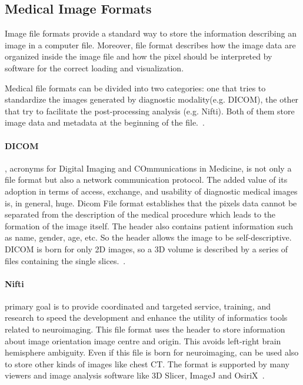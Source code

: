 \documentclass{standalone}
\begin{document}
	\subsection{Medical Image Formats}
	
 	Image file formats provide a standard way to store the information describing an image in a computer file. Moreover, file format describes how the image data are organized inside the image file and how the pixel should be interpreted by software for the correct loading and visualization.
 
	Medical file formats can be divided into two categories: one that tries to standardize the images generated by diagnostic modality(e.g. DICOM), the other that try to facilitate the post-processing analysis (e.g. Nifti). Both of them store image data and metadata at the beginning of the file.~\cite{ART:Larobina}. 
	
	\paragraph*{DICOM}, acronyms for Digital Imaging and COmmunications in Medicine, is not only a file format but also a network communication protocol. The added value of its adoption in terms of access, exchange, and usability of diagnostic medical images is, in general, huge. Dicom File format establishes that the pixels data cannot be separated from the description of the medical procedure which leads to the formation of the image itself. The header also contains patient information such as name, gender, age, etc. So the header allows the image to be self-descriptive. 
	DICOM is born for only 2D images, so a 3D volume is described by a series of files containing the single slices.~\cite{ART:Larobina}. 
	
	\paragraph*{Nifti} primary goal is to provide coordinated and targeted service, training, and research to speed the development and enhance the utility of informatics tools related to neuroimaging. This file format uses the header to store information about image orientation image centre and origin. This avoids left-right brain hemisphere ambiguity. Even if this file is born for neuroimaging, can be used also to store other kinds of images like chest CT. The format is supported by many viewers and image analysis software like 3D Slicer, ImageJ and OsiriX~\cite{ART:Larobina}. 
	
	
\end{document}
